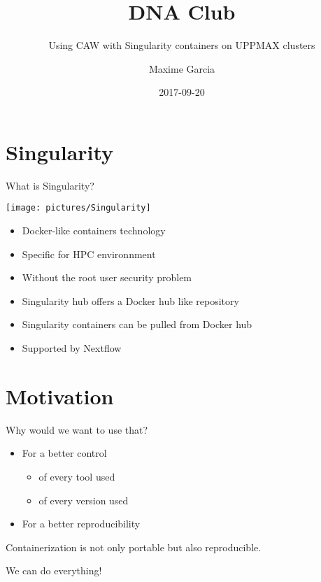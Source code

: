 \documentclass{beamer}
\author{Maxime Garcia}
\date{2017-09-20}
\title{DNA Club}
\subtitle{Using CAW with Singularity containers on UPPMAX clusters}
\institute{%
	\vfill
	\texttt{[image: pictures/SciLifeLab]}
	\hfill
	\texttt{[image: pictures/NGI]}
	\hfill
	\texttt{[image: pictures/NBIS]}
	\hfill
	\texttt{[image: pictures/KI]}
	\hfill
	\texttt{[image: pictures/KTH]}
	\hfill
	\texttt{[image: pictures/SU]}
	\hfill
	\texttt{[image: pictures/UU]}
	\hfill
	\texttt{[image: pictures/Barntumörbanken-logo]}
}
\begin{document}
\maketitle

\section{Singularity}

\begin{frame}{What is Singularity?}
	\begin{center}
		\texttt{[image: pictures/Singularity]}
	\end{center}
	\begin{itemize}
		\item Docker-like containers technology
		\item Specific for HPC environnment
		\pause
		\item Without the root user security problem
		\pause
		\item Singularity hub offers a Docker hub like repository
		\item Singularity containers can be pulled from Docker hub
		\pause
		\item Supported by Nextflow
	\end{itemize}
\end{frame}

\section{Motivation}

\begin{frame}{Why would we want to use that?}
	\begin{itemize}
		\item For a better control
		\pause
		\begin{itemize}
			\item of every tool used
			\item of every version used
		\end{itemize}
		\pause
		\item For a better reproducibility
		\pause
	\end{itemize}
	Containerization is not only portable but also reproducible.
\end{frame}

\begin{frame}{We can do everything!}
\end{frame}
\end{document}
